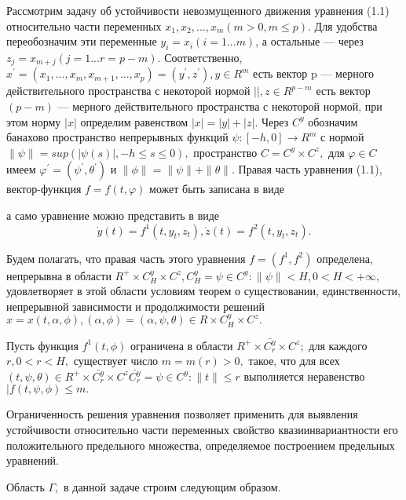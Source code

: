 	Рассмотрим задачу об устойчивости невозмущенного движения уравнения (1.1) относительно части переменных $x_1, x_2, ... , x_m (m > 0, m \le p).$ Для удобства переобозначим эти переменные $y_i = x_i (i = 1...m)$, а остальные --- через $z_j = x_{m+j} (j = 1...r = p - m).$ Соответственно, $x^{'} = (x_1, ... , x_m, x_{m+1}, ..., x_p) = (y^{'}, z^{'}), y \in R^m$ есть вектор p --- мерного действительного пространства с некоторой нормой $||, z \in R^{p-m}$ есть вектор $(p-m)$ --- мерного действительного пространства с некоторой нормой, при этом норму $|x|$ определим равенством $|x| = |y| + |z|.$ Через $C^y$ обозначим банахово пространство непрерывных функций $\psi : [-h, 0] \to R^m$ с нормой $\| \psi \| = sup(| \psi(s) |, -h \le s \le 0),$ пространство $C = C^y \times C^z,$ для $\varphi \in C$ имеем $\varphi^{'} = (\psi^{'}, \theta^{'})$ и $\| \phi \| = \| \psi \| + \| \theta \|.$ Правая часть уравнения (1.1), вектор-функция $f = f(t, \varphi)$ может быть записана в виде
	
	а само уравнение можно представить в виде 
	\begin{equation}
	\dot y(t) = f^1(t, y_t, z_t), \dot z(t) = f^2(t, y_t, z_t).
	\end{equation}
	
	Будем полагать, что правая часть этого уравнения $f = (f^1, f^2)$ определена, непрерывна в области $R^+ \times C^y_H \times C^z, C^y_H = {\psi \in C^y : \| \psi \| < H, 0 < H < +\infty}, $ удовлетворяет в этой области условиям теорем о существовании, единственности, непрерывной зависимости и продолжимости решений $x = x(t, \alpha, \phi), (\alpha, \phi) = (\alpha, \psi, \theta) \in R \times C^y_H \times C^z.$
	
	\begin{definition}\label{AS1} Пусть функция $f^1(t, \phi)$ ограничена в области $R^+ \times \bar{C_r^y} \times C^z; $ для каждого $r, 0 < r < H,$ существует число $m = m(r) > 0,$ такое, что для всех $(t, \psi, \theta) \in R^+ \times \bar{C_r^y} \times C^z \bar{C_r^y} = {\psi \in C^y : \| t \| \le r}$ выполняется неравенство $| f(t, \psi, \phi) \le m .$
	\end{definition}
	
	Ограниченность решения уравнения позволяет применить для выявления устойчивости относительно части переменных свойство квазиинвариантности его положительного предельного множества, определяемое построением предельных уравнений.
	
	Область $\Gamma, $ в данной задаче строим следующим образом. 
	
